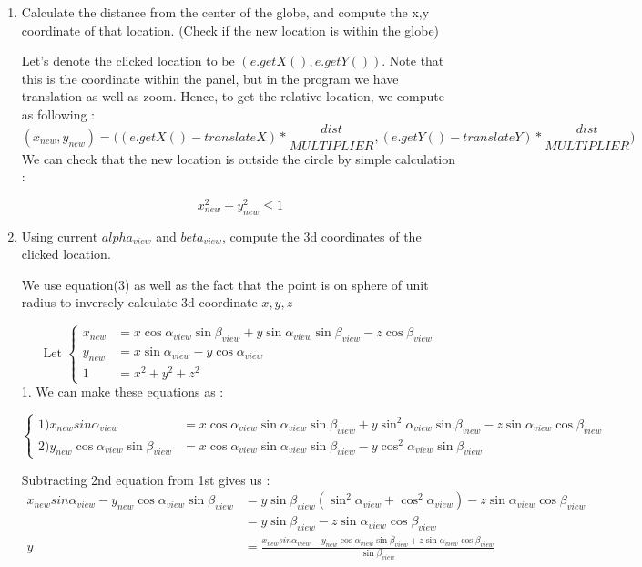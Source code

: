 \documentclass[]{article}
\begin{document}
 \begin{enumerate}
\item Calculate the distance from the center of the globe, and compute the x,y coordinate of that location. (Check if the new location is within the globe)

Let's denote the clicked location to be $(e.getX(),e.getY())$. Note that this is the coordinate within the panel, but in the program we have translation as well as zoom. Hence, to get the relative location, we compute as following : 
$$(x_{new},y_{new})=\bigg((e.getX()-translateX)*\frac{dist}{MULTIPLIER},(e.getY()-translateY)*\frac{dist}{MULTIPLIER}\bigg)$$
We can check that the new location is outside the circle by simple calculation : 

$$x_{new}^2 + y_{new}^2 \le 1$$
 
\item Using current $alpha_{view}$ and $beta_{view}$, compute the 3d coordinates of the clicked location.

We use equation(3) as well as the fact that the point is on sphere of unit radius to inversely calculate 3d-coordinate $x,y,z$

\[ \text{Let } 
\begin{cases}
x_{new} &= x\cos \alpha_{view} \sin \beta_{view} + y\sin \alpha_{view} \sin \beta_{view} -z\cos \beta_{view}  \\ 
y_{new} &= x\sin \alpha_{view} -y\cos \alpha_{view}\\ 
1 &= x^2 + y^2 + z^2
\end{cases}
\]
1. We can make these equations as : 

\[  
\begin{cases}
1)x_{new}sin\alpha_{view} &= x\cos \alpha_{view} \sin \alpha_{view} \sin \beta_{view} + y\sin^2 \alpha_{view} \sin \beta_{view} -z\sin \alpha_{view}\cos \beta_{view}  \\ 
2)y_{new}\cos \alpha_{view} \sin \beta_{view} &= x\cos \alpha_{view}\sin \alpha_{view}  \sin \beta_{view} -y\cos^2 \alpha_{view} \sin \beta_{view}
\end{cases}
\]

Subtracting 2nd equation from 1st gives us : \begin{equation*}
\begin{split}
x_{new}sin\alpha_{view} - y_{new}\cos \alpha_{view} \sin \beta_{view} &= y\sin \beta_{view}(\sin^2 \alpha_{view} + \cos^2 \alpha_{view})-z\sin \alpha_{view} \cos \beta_{view}\\
&=y\sin \beta_{view}-z\sin \alpha_{view} \cos \beta_{view}\\
y&=\frac{x_{new}sin\alpha_{view} - y_{new}\cos \alpha_{view} \sin \beta_{view}+z\sin \alpha_{view} \cos \beta_{view}}{\sin \beta_{view}}
\end{split}
\end{equation*}


\end{enumerate}
\end{document}
